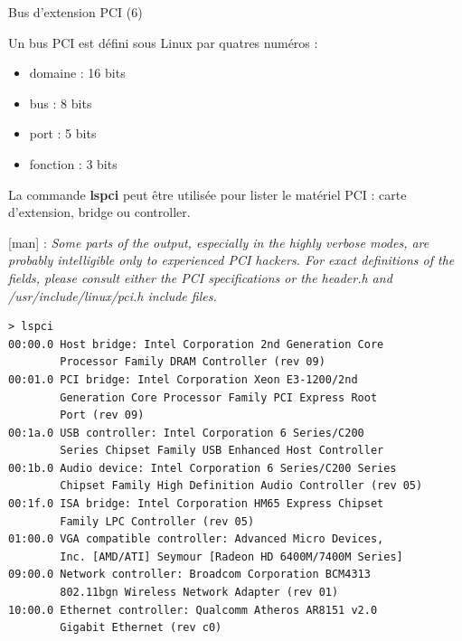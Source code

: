 \documentclass[12pt, t]{beamer}
\newcommand{\bi}{\begin{itemize}}
\newcommand{\ei}{\end{itemize}}
\begin{document}
\begin{frame}{Bus d'extension PCI (6)}

    \vspace{5pt}
    Un bus PCI est défini sous Linux par quatres numéros :
    \bi
    \itemsep5pt
    \item domaine : 16 bits
    \item bus : 8 bits
    \item port : 5 bits
    \item fonction : 3 bits
    \ei

    {
        \vspace{10pt}
        La commande {\textbf{lspci}} peut être utilisée pour lister le matériel
        PCI : carte d'extension, bridge ou controller.
    }

    {
        \vspace{10pt}
        [man] : {\textit{Some  parts  of  the  output,  especially in the
        highly verbose modes, are probably intelligible only to experienced PCI
        hackers. For exact definitions of the fields, please consult either the
        PCI specifications or the header.h and /usr/include/linux/pci.h include
        files.}}
    }

\end{frame}

{
    \begin{lstlisting}[basicstyle=\scriptsize]
> lspci
00:00.0 Host bridge: Intel Corporation 2nd Generation Core
        Processor Family DRAM Controller (rev 09)
00:01.0 PCI bridge: Intel Corporation Xeon E3-1200/2nd
        Generation Core Processor Family PCI Express Root
        Port (rev 09)
00:1a.0 USB controller: Intel Corporation 6 Series/C200
        Series Chipset Family USB Enhanced Host Controller
00:1b.0 Audio device: Intel Corporation 6 Series/C200 Series
        Chipset Family High Definition Audio Controller (rev 05)
00:1f.0 ISA bridge: Intel Corporation HM65 Express Chipset
        Family LPC Controller (rev 05)
01:00.0 VGA compatible controller: Advanced Micro Devices,
        Inc. [AMD/ATI] Seymour [Radeon HD 6400M/7400M Series]
09:00.0 Network controller: Broadcom Corporation BCM4313
        802.11bgn Wireless Network Adapter (rev 01)
10:00.0 Ethernet controller: Qualcomm Atheros AR8151 v2.0
        Gigabit Ethernet (rev c0)
\end{lstlisting}
}
\end{document}
